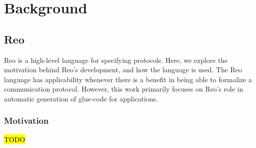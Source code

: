 
\chapter{Background}
\label{sec:background}
\section{Reo}
\label{sec:reo_background}
Reo is a high-level language for specifying protocols. Here, we explore the motivation behind Reo's development, and how the language is used.
The Reo language has applicability whenever there is a benefit in being able to formalize a communication protocol. However, this work primarily focuses on Reo's role in automatic generation of glue-code for applications.  

\subsection{Motivation}
\label{sec:reo_motivation}
\hl{TODO}
%
%

